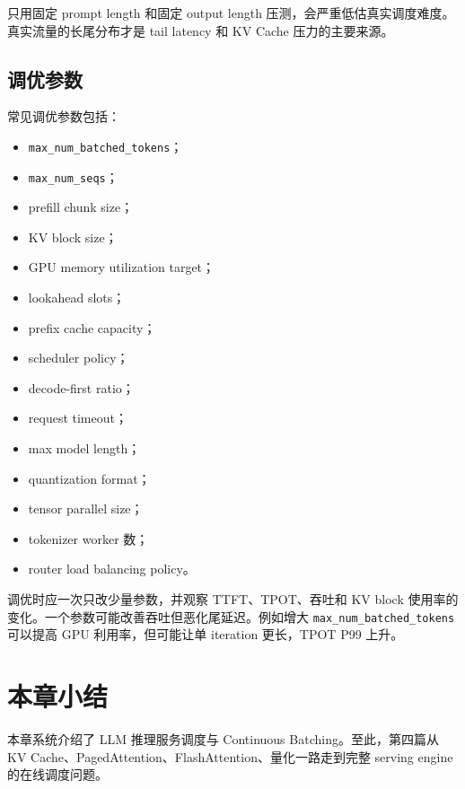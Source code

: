 只用固定 prompt length 和固定 output length 压测，会严重低估真实调度难度。真实流量的长尾分布才是 tail latency 和 KV Cache 压力的主要来源。

\subsection{调优参数}
\label{subsec:serving-tuning-knobs}

常见调优参数包括：

\begin{itemize}
\item \texttt{max_num_batched_tokens}；
\item \texttt{max_num_seqs}；
\item prefill chunk size；
\item KV block size；
\item GPU memory utilization target；
\item lookahead slots；
\item prefix cache capacity；
\item scheduler policy；
\item decode-first ratio；
\item request timeout；
\item max model length；
\item quantization format；
\item tensor parallel size；
\item tokenizer worker 数；
\item router load balancing policy。
\end{itemize}

调优时应一次只改少量参数，并观察 TTFT、TPOT、吞吐和 KV block 使用率的变化。一个参数可能改善吞吐但恶化尾延迟。例如增大 \texttt{max_num_batched_tokens} 可以提高 GPU 利用率，但可能让单 iteration 更长，TPOT P99 上升。

\section{本章小结}
\label{sec:chapter16-summary}

本章系统介绍了 LLM 推理服务调度与 Continuous Batching。至此，第四篇从 KV Cache、PagedAttention、FlashAttention、量化一路走到完整 serving engine 的在线调度问题。

